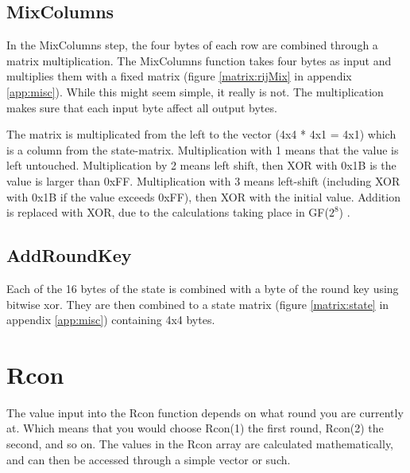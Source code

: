 \subsection{MixColumns}
In the MixColumns step, the four bytes of each row are combined through a matrix 
multiplication. The MixColumns function takes four bytes as input and multiplies 
them with a fixed matrix (figure \ref{matrix:rijMix} in appendix 
\ref{app:misc}). While this might seem simple, it really is not. The 
multiplication makes sure that each input byte affect all output bytes.
\citep{Angelfire}

The matrix is multiplicated from the left to the vector (4x4 * 4x1 = 4x1) which 
is a column from the state-matrix. Multiplication with 1 means that the value 
is left untouched. Multiplication by 2 means left shift, then XOR with 0x1B is 
the value is larger than 0xFF. Multiplication with 3 means left-shift (including 
XOR with 0x1B if the value exceeds 0xFF), then XOR with the initial value. 
Addition is replaced with XOR, due to the calculations taking place in 
GF(\(2^8\)) .


\subsection{AddRoundKey}
Each of the 16 bytes of the state is combined with a byte of the round key 
using bitwise xor. They are then combined to a state matrix (figure 
\ref{matrix:state} in appendix \ref{app:misc}) containing 4x4 bytes.

\section{Rcon} \label{ch:Rcon}
The value input into the Rcon function depends on what round you are currently 
at. Which means that you would choose Rcon(1) the first round, Rcon(2) the 
second, and so on. The values in the Rcon array are calculated mathematically, 
and can then be accessed through a simple vector or such.


